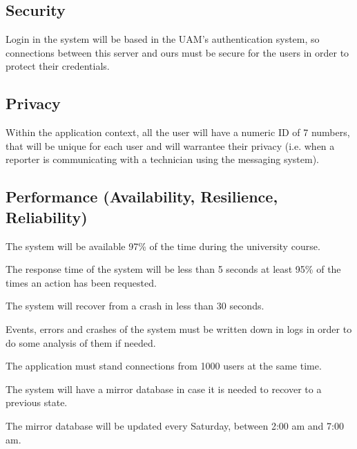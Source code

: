 \subsection{Security}
\begin{NFrequirement}
Login in the system will be based in the UAM's authentication system, so connections between this server and ours must be secure for the users in order to protect their credentials.
\end{NFrequirement}

\subsection{Privacy}
\begin{NFrequirement}
Within the application context, all the user will have a numeric ID of 7 numbers, that will be unique for each user and will warrantee their privacy (i.e. when a reporter is communicating with a technician using the messaging system).
\end{NFrequirement}

\subsection{Performance (Availability, Resilience, Reliability)}
\begin{NFrequirement}
The system will be available 97\% of the time during the university course.
\end{NFrequirement}
\begin{NFrequirement}
The response time of the system will be less than 5 seconds at least 95\% of the times an action has been requested.
\end{NFrequirement}
\begin{NFrequirement}
The system will recover from a crash in less than 30 seconds.
\end{NFrequirement}
\begin{NFrequirement}
Events, errors and crashes of the system must be written down in logs in order to do some analysis of them if needed.
\end{NFrequirement}
\begin{NFrequirement}
The application must stand connections from 1000 users at the same time.
\end{NFrequirement}
\begin{NFrequirement}
The system will have a mirror database in case it is needed to recover to a previous state.
\end{NFrequirement}
\begin{NFrequirement}
The mirror database will be updated every Saturday, between 2:00 am and 7:00 am.
\end{NFrequirement}

